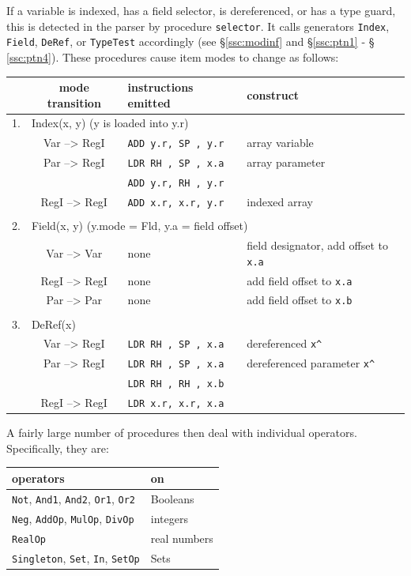 If a variable is indexed, has a field selector, is dereferenced, or has a type guard, this is detected
in the parser by procedure \verb|selector|. It calls generators \verb|Index|, \verb|Field|,
\verb|DeRef|, or \verb|TypeTest| accordingly (see \S \ref{ssc:modinf} and \S \ref{ssc:ptn1} - \S
\ref{ssc:ptn4}).  These procedures cause item modes to change as follows:
\begin{table}[h!]
  \centering
  \begin{tabular}{c c l l}
       & mode transition & instructions emitted & construct \\\hline
    1. & \multicolumn{3}{l}{Index(x, y) (y is loaded into y.r)} \\
       &  Var --> RegI   & \verb|ADD y.r, SP , y.r| & array variable \\
       &  Par --> RegI   & \verb|LDR RH , SP , x.a| & array parameter\\
       &                 & \verb|ADD y.r, RH , y.r|\\
       & RegI --> RegI   & \verb|ADD x.r, x.r, y.r| & indexed array \\\\

    2. & \multicolumn{3}{l}{Field(x, y) (y.mode = Fld, y.a = field offset)} \\
       &  Var --> Var    & none & field designator, add offset to \verb|x.a| \\
       & RegI --> RegI   & none & add field offset to \verb|x.a| \\
       &  Par --> Par    & none & add field offset to \verb|x.b| \\\\

    3. & \multicolumn{3}{l}{DeRef(x)} \\
       &  Var --> RegI   & \verb|LDR RH , SP , x.a| & dereferenced \verb|x^| \\
       &  Par --> RegI   & \verb|LDR RH , SP , x.a| & dereferenced parameter \verb|x^| \\
       &                 & \verb|LDR RH , RH , x.b| \\
       & RegI --> RegI   & \verb|LDR x.r, x.r, x.a|
  \end{tabular}
\end{table}

A fairly large number of procedures then deal with individual operators. Specifically, they are:
\begin{table}[h!]
  \centering
  \begin{tabular}{l l}
    operators & on \\\hline
    \verb|Not|, \verb|And1|, \verb|And2|, \verb|Or1|, \verb|Or2| & Booleans \\
    \verb|Neg|, \verb|AddOp|, \verb|MulOp|, \verb|DivOp|         & integers \\
    \verb|RealOp|                                                & real numbers \\
    \verb|Singleton|, \verb|Set|, \verb|In|, \verb|SetOp|        & Sets
  \end{tabular}
\end{table}

